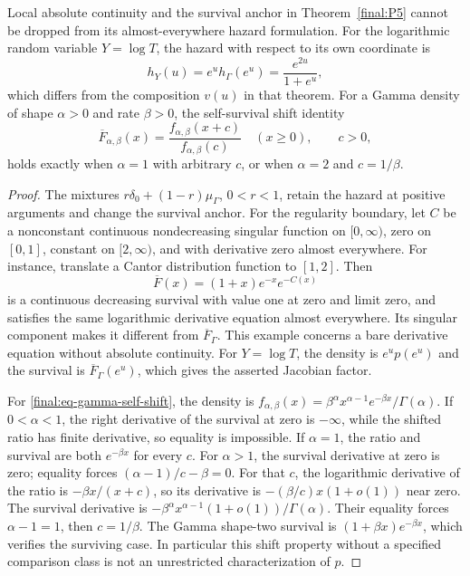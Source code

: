 \begin{proposition}
\label{final:P5-survival-boundaries}
Local absolute continuity and the survival anchor in
Theorem~\ref{final:P5} cannot be dropped from its almost-everywhere
hazard formulation.  For the logarithmic random variable $Y=\log T$,
the hazard with respect to its own coordinate is
\[
 h_Y(u)=e^u h_\Gamma(e^u)=\frac{e^{2u}}{1+e^u},
\]
which differs from the composition $v(u)$ in that theorem.
For a Gamma density of shape $\alpha>0$ and rate $\beta>0$, the
self-survival shift identity
\begin{equation}
 \overline F_{\alpha,\beta}(x)
 =\frac{f_{\alpha,\beta}(x+c)}{f_{\alpha,\beta}(c)}
                  \quad(x\geq0),\qquad c>0,
 \label{final:eq-gamma-self-shift}
\end{equation}
holds exactly when $\alpha=1$ with arbitrary $c$, or when
$\alpha=2$ and $c=1/\beta$.
\end{proposition}
\begin{proof}
The mixtures $r\delta_0+(1-r)\mu_\Gamma$, $0<r<1$, retain the
hazard at positive arguments and change the survival anchor.
For the regularity boundary, let $C$ be a nonconstant continuous
nondecreasing singular function on $[0,\infty)$, zero on $[0,1]$,
constant on $[2,\infty)$, and with derivative zero almost everywhere.
For instance, translate a Cantor distribution function to $[1,2]$.
Then
\[
 \overline F(x)=(1+x)e^{-x}e^{-C(x)}
\]
is a continuous decreasing survival with value one at zero and
limit zero, and satisfies the same logarithmic derivative equation
almost everywhere.  Its singular component makes it different
from $\overline F_\Gamma$.  This example concerns a bare derivative
equation without absolute continuity.  For $Y=\log T$, the density
is $e^u p(e^u)$ and the survival is
$\overline F_\Gamma(e^u)$, which gives the asserted Jacobian factor.

For \eqref{final:eq-gamma-self-shift}, the density is
$f_{\alpha,\beta}(x)=\beta^\alpha x^{\alpha-1}e^{-\beta x}/
\Gamma(\alpha)$.  If $0<\alpha<1$, the right derivative of the
survival at zero is $-\infty$, while the shifted ratio has finite
derivative, so equality is impossible.  If $\alpha=1$, the ratio
and survival are both $e^{-\beta x}$ for every $c$.
For $\alpha>1$, the survival derivative at zero is zero; equality
forces $(\alpha-1)/c-\beta=0$.  For that $c$, the logarithmic
derivative of the ratio is $-\beta x/(x+c)$, so its derivative is
$-(\beta/c)x(1+o(1))$ near zero.  The survival derivative is
$-\beta^\alpha x^{\alpha-1}(1+o(1))/\Gamma(\alpha)$.
Their equality forces $\alpha-1=1$, then $c=1/\beta$.
The Gamma shape-two survival is $(1+\beta x)e^{-\beta x}$,
which verifies the surviving case.  In particular this shift
property without a specified comparison class is not an
unrestricted characterization of $p$.
\end{proof}

